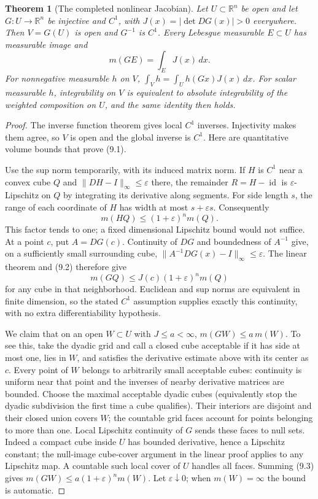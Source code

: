 \documentclass[11pt,oneside,openany]{book}
\newtheorem{theorem}{Theorem}[chapter]
\theoremstyle{definition}
\theoremstyle{remark}
\newcommand{\R}{\mathbb R}\newcommand{\C}{\mathbb C}
\newcommand{\eps}{\varepsilon}\newcommand{\ee}{\varepsilon}
\DeclareMathOperator{\id}{id}\DeclareMathOperator{\supp}{supp}
\newcommand{\family}[1]{}
\begin{document}
\begin{theorem}[The completed nonlinear Jacobian]\family{D11.09.c1_jacobian}\label{d11:09:c1-jacobian}
Let $U\subset\R^n$ be open and let $G:U\to\R^n$ be injective and $C^1$,
with $J(x)=|\det DG(x)|>0$ everywhere. Then $V=G(U)$ is open and $G^{-1}$
is $C^1$. Every Lebesgue measurable $E\subset U$ has measurable image and
\[
 m(GE)=\int_EJ(x)\,dx.                                      \tag{9.1}
\]
For nonnegative measurable $h$ on $V$,
$\int_Vh=\int_Uh(Gx)J(x)\,dx$.
For scalar measurable $h$, integrability on $V$ is equivalent to absolute
integrability of the weighted composition on $U$, and the same identity
then holds.
\end{theorem}
\begin{proof}
The inverse function theorem gives local $C^1$ inverses. Injectivity makes
them agree, so $V$ is open and the global inverse is $C^1$.
Here are quantitative volume bounds that prove (9.1).

Use the sup norm temporarily, with its induced matrix norm. If $H$ is
$C^1$ near a convex cube $Q$ and $\|DH-I\|_\infty\leq\eps$ there,
the remainder $R=H-\id$ is $\eps$-Lipschitz on $Q$ by integrating its
derivative along segments. For side length $s$, the range of each
coordinate of $H$ has width at most $s+\eps s$. Consequently
\[
 m(HQ)\leq(1+\eps)^n m(Q).                                \tag{9.2}
\]
This factor tends to one; a fixed dimensional Lipschitz bound would not
suffice. At a point $c$, put $A=DG(c)$. Continuity of $DG$ and boundedness
of $A^{-1}$ give, on a sufficiently small surrounding cube,
$\|A^{-1}DG(x)-I\|_\infty\leq\eps$. The linear theorem and (9.2)
therefore give
\[
 m(GQ)\leq J(c)(1+\eps)^n m(Q)                             \tag{9.3}
\]
for any cube in that neighborhood. Euclidean and sup norms are equivalent
in finite dimension, so the stated $C^1$ assumption supplies exactly this
continuity, with no extra differentiability hypothesis.

We claim that on an open $W\subset U$ with $J\leq a<\infty$,
$m(GW)\leq a\,m(W)$. To see this, take the dyadic grid and call a closed
cube acceptable if it has side at most one, lies in $W$, and satisfies
the derivative estimate above with its center as $c$. Every point of $W$
belongs to arbitrarily small acceptable cubes: continuity is uniform near
that point and the inverses of nearby derivative matrices are bounded.
Choose the maximal acceptable dyadic cubes (equivalently stop the dyadic
subdivision the first time a cube qualifies). Their interiors are disjoint
and their closed union covers $W$; the countable grid faces account for
points belonging to more than one. Local Lipschitz continuity of $G$ sends
these faces to null sets. Indeed a compact cube inside $U$ has bounded
derivative, hence a Lipschitz constant; the null-image cube-cover argument
in the linear proof applies to any Lipschitz map. A countable such local
cover of $U$ handles all faces. Summing (9.3) gives
$m(GW)\leq a(1+\eps)^n m(W)$. Let $\eps\downarrow0$; when $m(W)=\infty$
the bound is automatic.


\end{proof}
\end{document}

